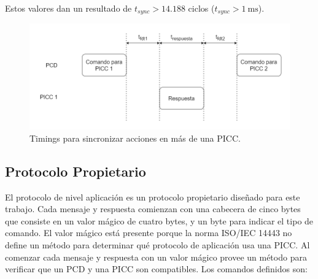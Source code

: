 \documentclass[a4paper, twoside, 11pt]{report}
\begin{document}
Estos valores dan un resultado de $t_{sync} > 14.188$ ciclos ($t_{sync} > \SI{1}{\milli\second}$).

\begin{figure}[htb]
  \centering
  \includegraphics[width=1.0\textwidth]{./img/app_synch3.drawio}
  \caption{Timings para sincronizar acciones en más de una PICC.}
  \label{fig:app_synch}
\end{figure}

\FloatBarrier
\subsection{Protocolo Propietario}

El protocolo de nivel aplicación es un protocolo propietario diseñado para este trabajo. Cada mensaje y respuesta comienzan con una cabecera de cinco bytes que consiste en un valor mágico de cuatro bytes, y un byte para indicar el tipo de comando. El valor mágico está presente porque la norma ISO/IEC 14443 no define un método para determinar qué protocolo de aplicación usa una PICC. Al comenzar cada mensaje y respuesta con un valor mágico provee un método para verificar que un PCD y una PICC son compatibles. Los comandos definidos son:
\end{document}
